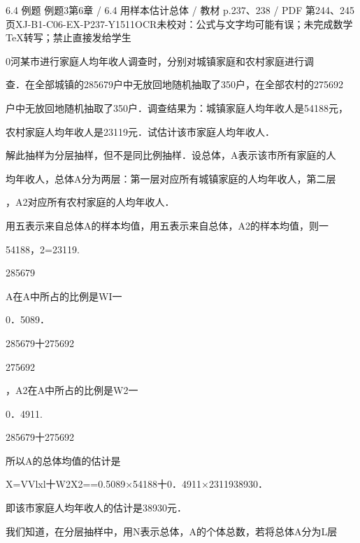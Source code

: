 \begin{bankitem}{6.4 例题 例题3}{第6章 / 6.4 用样本估计总体 / 教材 p.237、238 / PDF 第244、245页}{XJ-B1-C06-EX-P237-Y1511}{OCR未校对：公式与文字均可能有误；未完成数学TeX转写；禁止直接发给学生}
\begin{ocrdraft}
\par
0河某市进行家庭人均年收人调查时，分别对城镇家庭和农村家庭进行调
\par
查．在全部城镇的285679户中无放回地随机抽取了350户，在全部农村的275692
\par
户中无放回地随机抽取了350户．调查结果为：城镇家庭人均年收人是54188元，
\par
[教材p.238 / PDF第245页]
\par
农村家庭人均年收人是23119元．试估计该市家庭人均年收人．
\par
解此抽样为分层抽样，但不是同比例抽样．设总体，A表示该市所有家庭的人
\par
均年收人，总体A分为两层：第一层对应所有城镇家庭的人均年收人，第二层
\par
，A2对应所有农村家庭的人均年收人．
\par
用五表示来自总体A的样本均值，用五表示来自总体，A2的样本均值，则一
\par
54188，2=23119.
\par
285679
\par
A在A中所占的比例是WI一
\par
0．5089．
\par
285679十275692
\par
275692
\par
，A2在A中所占的比例是W2一
\par
0．4911.
\par
285679十275692
\par
所以A的总体均值的估计是
\par
X=VVlxl十W2X2==0.5089\ensuremath{\times}54188十0．4911\ensuremath{\times}2311938930．
\par
即该市家庭人均年收人的估计是38930元．
\par
我们知道，在分层抽样中，用N表示总体，A的个体总数，若将总体A分为L层
\par

\end{ocrdraft}
\end{bankitem}
